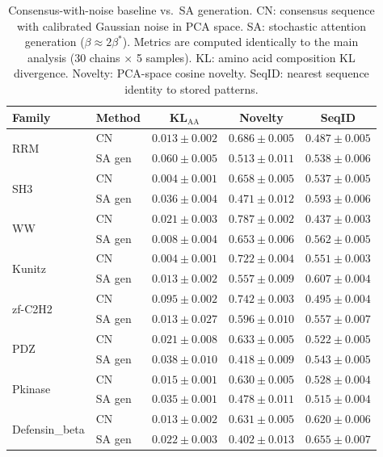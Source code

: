 \begin{table}[ht]
\centering
\caption{Consensus-with-noise baseline vs.\ SA generation. CN: consensus sequence with calibrated Gaussian noise in PCA space. SA: stochastic attention generation ($\beta \approx 2\beta^*$). Metrics are computed identically to the main analysis (30 chains $\times$ 5 samples). KL: amino acid composition KL divergence. Novelty: PCA-space cosine novelty. SeqID: nearest sequence identity to stored patterns.}
\label{tab:consensus-baseline}
\small
\begin{tabular}{@{}llccc@{}}
\toprule
Family & Method & KL$_{\mathrm{AA}}$ & Novelty & SeqID \\
\midrule
\multirow{2}{*}{RRM}
 & CN & $0.013 \pm 0.002$ & $0.686 \pm 0.005$ & $0.487 \pm 0.005$ \\
 & SA gen & $0.060 \pm 0.005$ & $0.513 \pm 0.011$ & $0.538 \pm 0.006$ \\
\midrule
\multirow{2}{*}{SH3}
 & CN & $0.004 \pm 0.001$ & $0.658 \pm 0.005$ & $0.537 \pm 0.005$ \\
 & SA gen & $0.036 \pm 0.004$ & $0.471 \pm 0.012$ & $0.593 \pm 0.006$ \\
\midrule
\multirow{2}{*}{WW}
 & CN & $0.021 \pm 0.003$ & $0.787 \pm 0.002$ & $0.437 \pm 0.003$ \\
 & SA gen & $0.008 \pm 0.004$ & $0.653 \pm 0.006$ & $0.562 \pm 0.005$ \\
\midrule
\multirow{2}{*}{Kunitz}
 & CN & $0.004 \pm 0.001$ & $0.722 \pm 0.004$ & $0.551 \pm 0.003$ \\
 & SA gen & $0.013 \pm 0.002$ & $0.557 \pm 0.009$ & $0.607 \pm 0.004$ \\
\midrule
\multirow{2}{*}{zf-C2H2}
 & CN & $0.095 \pm 0.002$ & $0.742 \pm 0.003$ & $0.495 \pm 0.004$ \\
 & SA gen & $0.013 \pm 0.027$ & $0.596 \pm 0.010$ & $0.557 \pm 0.007$ \\
\midrule
\multirow{2}{*}{PDZ}
 & CN & $0.021 \pm 0.008$ & $0.633 \pm 0.005$ & $0.522 \pm 0.005$ \\
 & SA gen & $0.038 \pm 0.010$ & $0.418 \pm 0.009$ & $0.543 \pm 0.005$ \\
\midrule
\multirow{2}{*}{Pkinase}
 & CN & $0.015 \pm 0.001$ & $0.630 \pm 0.005$ & $0.528 \pm 0.004$ \\
 & SA gen & $0.035 \pm 0.001$ & $0.478 \pm 0.011$ & $0.515 \pm 0.004$ \\
\midrule
\multirow{2}{*}{Defensin\_beta}
 & CN & $0.013 \pm 0.002$ & $0.631 \pm 0.005$ & $0.620 \pm 0.006$ \\
 & SA gen & $0.022 \pm 0.003$ & $0.402 \pm 0.013$ & $0.655 \pm 0.007$ \\
\bottomrule
\end{tabular}
\end{table}

